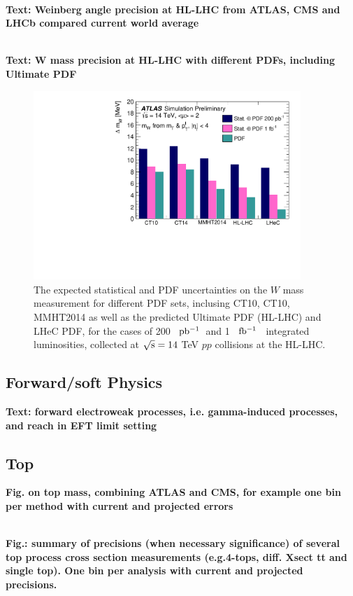 \documentclass{article}
\newcommand*{\fbinv}{\ensuremath{{\rm fb^{-1}}}\xspace}
\newcommand*{\pbinv}{\ensuremath{{\rm pb^{-1}}}\xspace}
\begin{document}
\\
{\bf Text: Weinberg angle precision at HL-LHC from ATLAS, CMS and LHCb compared current world average}


\\
{\bf Text: W mass precision at HL-LHC with different PDFs, including Ultimate PDF}


\begin{figure}
\centering
\includegraphics[width=0.9\textwidth]{Wmass_fig_06.pdf}
\caption{\label{Fig:Wmass} The expected statistical and PDF uncertainties on the $W$ mass measurement for different PDF sets, inclusing CT10, CT10, MMHT2014 as well as the predicted Ultimate PDF (HL-LHC) and LHeC PDF,  for the cases of 200 ~\pbinv ~and 1 ~\fbinv~  integrated luminosities, collected at ${\rm \sqrt{s}=14}$ TeV $pp$ collisions at the HL-LHC.}
\end{figure}


\subsection{Forward/soft Physics}

{\bf Text: forward electroweak processes, i.e. gamma-induced processes, and reach in EFT limit setting}

\subsection{Top}


{\bf Fig. on top mass, combining ATLAS and CMS, for example one bin per method with current and projected errors}


\\
{\bf Fig.: summary of precisions (when necessary significance) of several top process cross section measurements (e.g.4-tops, diff. Xsect tt and single top). One bin per analysis with current and projected precisions.}
\end{document}
